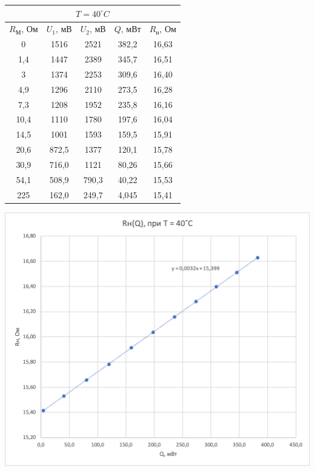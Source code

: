\documentclass[a4paper, 12pt]{article}
\begin{document}
\begin{table}[pt]
        \vspace{1cm}
        
        \begin{minipage}[ht]{0.47\linewidth}
            \begin{tabular}{|c|c|c|c|c|}
                \hline
                \multicolumn{5}{|c|}{$T = 40^\circ C$} \\
                \hline
                $R_М$, Ом & $U_1$, мВ & $U_2$, мВ & $Q$, мВт & $R_н$, Ом \\
                \hline
                0 & 1516 & 2521 & 382,2 & 16,63 \\
                \hline
                1,4 & 1447 & 2389 & 345,7 & 16,51 \\
                \hline
                3 & 1374 & 2253 & 309,6 & 16,40 \\
                \hline
                4,9 & 1296 & 2110 & 273,5 & 16,28 \\
                \hline
                7,3 & 1208 & 1952 & 235,8 & 16,16 \\
                \hline
                10,4 & 1110 & 1780 & 197,6 & 16,04 \\
                \hline
                14,5 & 1001 & 1593 & 159,5 & 15,91 \\
                \hline
                20,6 & 872,5 & 1377 & 120,1 & 15,78 \\
                \hline
                30,9 & 716,0 & 1121 & 80,26 & 15,66 \\
                \hline
                54,1 & 508,9 & 790,3 & 40,22 & 15,53 \\
                \hline
                225 & 162,0 & 249,7 & 4,045 & 15,41 \\
                \hline
            \end{tabular}   
        \end{minipage}
        \hfill
        \begin{minipage}[ht]{0.47\linewidth}
            \includegraphics[width=\linewidth]{images/ch3.png}    
        \end{minipage}
        
    \end{table}
    
\end{document}
